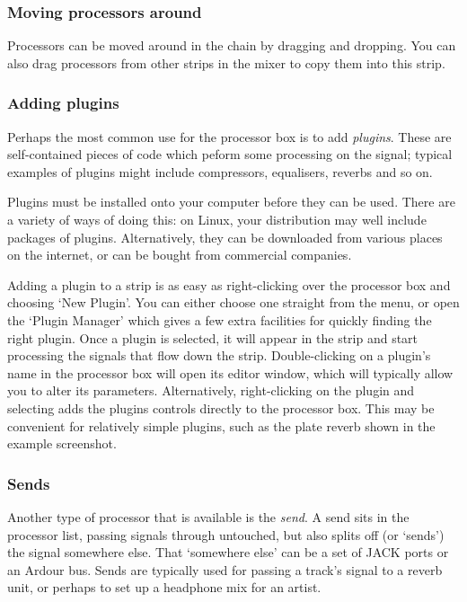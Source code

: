 \documentclass[10pt,a4paper]{book}
\newcommand{\menu}[1]{\emph{\StrSubstitute{#1}{,}{ $\rightarrow$ }}}
\begin{document}
\subsubsection{Moving processors around}

Processors can be moved around in the chain by dragging and dropping.
You can also drag processors from other strips in the mixer to copy
them into this strip.  

\subsubsection{Adding plugins}

Perhaps the most common use for the processor box is to add
\emph{plugins}.  These are self-contained pieces of code which peform
some processing on the signal; typical examples of plugins might
include compressors, equalisers, reverbs and so on.

Plugins must be installed onto your computer before they can be used.
There are a variety of ways of doing this: on Linux, your distribution
may well include packages of plugins.  Alternatively, they can be
downloaded from various places on the internet, or can be bought from
commercial companies.


Adding a plugin to a strip is as easy as right-clicking over the
processor box and choosing `New Plugin'.  You can either choose one
straight from the menu, or open the `Plugin Manager' which gives a few
extra facilities for quickly finding the right plugin.  Once a plugin
is selected, it will appear in the strip and start processing the
signals that flow down the strip.  Double-clicking on a plugin's name
in the processor box will open its editor window, which will typically
allow you to alter its parameters.  Alternatively, right-clicking on
the plugin and selecting \menu{Controls,Show All Controls} adds the
plugins controls directly to the processor box.  This may be
convenient for relatively simple plugins, such as the plate reverb
shown in the example screenshot.

\subsubsection{Sends}

Another type of processor that is available is the \emph{send}.  A
send sits in the processor list, passing signals through untouched,
but also splits off (or `sends') the signal somewhere else.  That
`somewhere else' can be a set of JACK ports or an Ardour bus.  Sends
are typically used for passing a track's signal to a reverb unit, or
perhaps to set up a headphone mix for an artist.
\end{document}
